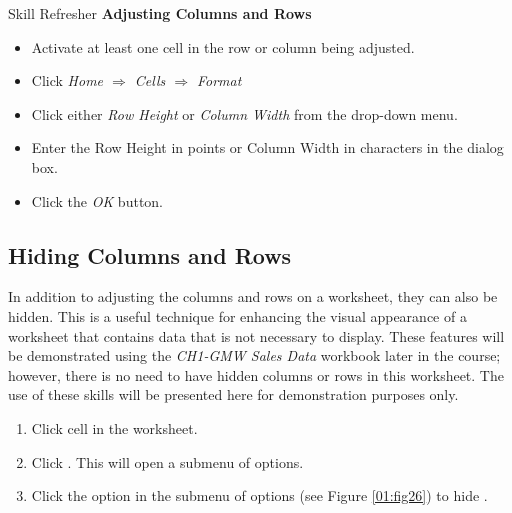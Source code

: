 \begin{center}
	\begin{sklbox}{Skill Refresher}
		\textbf{Adjusting Columns and Rows}
		\\
		\begin{itemize}
			\setlength{\itemsep}{0pt}
			\setlength{\parskip}{0pt}
			\setlength{\parsep}{0pt}
			
			\item Activate at least one cell in the row or column being adjusted.
			\item Click \textit{Home $ \Rightarrow $ Cells $ \Rightarrow $ Format}
			\item Click either \textit{Row Height} or \textit{Column Width} from the drop-down menu.
			\item Enter the Row Height in points or Column Width in characters in the dialog box.
			\item Click the \textit{OK} button.
			
		\end{itemize}
	\end{sklbox}
\end{center}

\subsection{Hiding Columns and Rows}

In addition to adjusting the columns and rows on a worksheet, they can also be hidden. This is a useful technique for enhancing the visual appearance of a worksheet that contains data that is not necessary to display. These features will be demonstrated using the \textit{CH1-GMW Sales Data} workbook later in the course; however, there is no need to have hidden columns or rows in this worksheet. The use of these skills will be presented here for demonstration purposes only.

\begin{enumbox}
	\begin{enumerate}
		\item Click cell  in the  worksheet.
		\item Click . This will open a submenu of options.
		\item Click the  option in the submenu of options (see Figure \ref{01:fig26}) to hide .
	\end{enumerate}
\end{enumbox}

